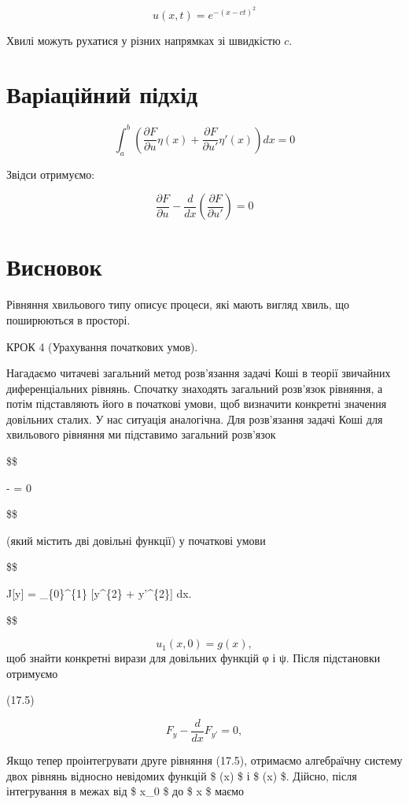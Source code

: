 \documentclass[
  ukrainian,
]{article}
\begin{document}
\[
u(x,t) = e^{-(x - ct)^2}
\]

Хвилі можуть рухатися у різних напрямках зі швидкістю \(c\).

\section{Варіаційний
підхід}\label{ux432ux430ux440ux456ux430ux446ux456ux439ux43dux438ux439-ux43fux456ux434ux445ux456ux434}

\[
\int_a^b \left( \frac{\partial F}{\partial u} \eta(x) + \frac{\partial F}{\partial u'} \eta'(x) \right) dx = 0
\]

Звідси отримуємо:

\[
\frac{\partial F}{\partial u} - \frac{d}{dx}\left( \frac{\partial F}{\partial u'} \right) = 0
\]

\section{Висновок}\label{ux432ux438ux441ux43dux43eux432ux43eux43a-1}

Рівняння хвильового типу описує процеси, які мають вигляд хвиль, що
поширюються в просторі.

КРОК 4 (Урахування початкових умов).

Нагадаємо читачеві загальний метод розв'язання задачі Коші в теорії
звичайних диференціальних рівнянь. Спочатку знаходять загальний
розв'язок рівняння, а потім підставляють його в початкові умови, щоб
визначити конкретні значення довільних сталих. У нас ситуація
аналогічна. Для розв'язання задачі Коші для хвильового рівняння ми
підставимо загальний розв'язок

\$\$

 - 
 = 0

\$\$

(який містить дві довільні функції) у початкові умови

\$\$

J{[}y{]} = \int\_\{0\}\^{}\{1\} {[}y\^{}\{2\} + y'\^{}\{2\}{]} dx.

\$\$

\[ u_1(x, 0) = g(x), \] щоб знайти конкретні вирази для довільних
функцій φ і ψ. Після підстановки отримуємо

(17.5)

\[
F_y - \frac{d}{dx} F_{y'} = 0,
\]

Якщо тепер проінтегрувати друге рівняння (17.5), отримаємо алгебраїчну
систему двох рівнянь відносно невідомих функцій \$ \varphi(x) \$ і \$
\psi(x) \$. Дійсно, після інтегрування в межах від \$ x\_0 \$ до \$ x \$
маємо
\end{document}
